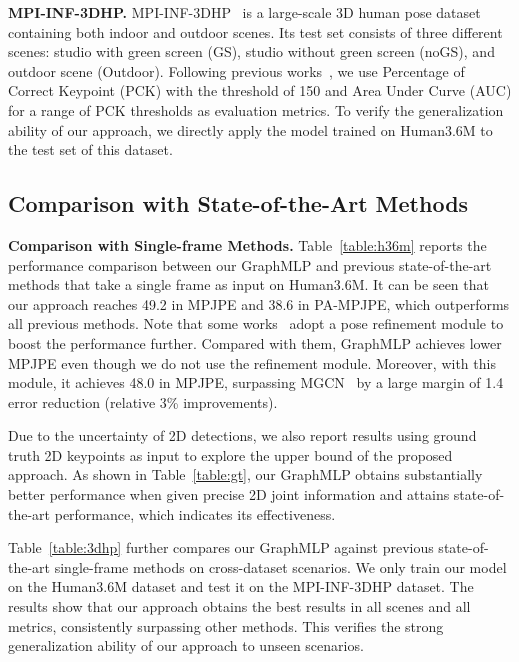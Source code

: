 \documentclass[lettersize,journal]{IEEEtran}
\begin{document}
\noindent \textbf{MPI-INF-3DHP.}
MPI-INF-3DHP~\cite{mehta2017monocular} is a large-scale 3D human pose dataset containing both indoor and outdoor scenes. 
Its test set consists of three different scenes: studio with green screen (GS), studio without green screen (noGS), and outdoor scene (Outdoor).
Following previous works~\cite{ci2019optimizing,zeng2021learning,zou2021modulated}, we use Percentage of Correct Keypoint (PCK) with the threshold of 150  and Area Under Curve (AUC) for a range of PCK thresholds as evaluation metrics. 
To verify the generalization ability of our approach, we directly apply the model trained on Human3.6M to the test set of this dataset. 

\subsection{Comparison with State-of-the-Art Methods}
\noindent \textbf{Comparison with Single-frame Methods.}
Table~\ref{table:h36m} reports the performance comparison between our GraphMLP and previous state-of-the-art methods that take a single frame as input on Human3.6M. 
It can be seen that our approach reaches 49.2  in MPJPE and 38.6  in PA-MPJPE, which outperforms all previous methods. 
Note that some works~\cite{stgcn,zou2021modulated} adopt a pose refinement module to boost the performance further. 
Compared with them, GraphMLP achieves lower MPJPE even though we do not use the refinement module. 
Moreover, with this module, it achieves 48.0  in MPJPE, surpassing MGCN~\cite{zou2021modulated} by a large margin of 1.4  error reduction (relative 3\% improvements). 

Due to the uncertainty of 2D detections, we also report results using ground truth 2D keypoints as input to explore the upper bound of the proposed approach. 
As shown in Table~\ref{table:gt}, our GraphMLP obtains substantially better performance when given precise 2D joint information and attains state-of-the-art performance, which indicates its effectiveness. 

Table~\ref{table:3dhp} further compares our GraphMLP against previous state-of-the-art single-frame methods on cross-dataset scenarios. 
We only train our model on the Human3.6M dataset and test it on the MPI-INF-3DHP dataset. 
The results show that our approach obtains the best results in all scenes and all metrics, consistently surpassing other methods. 
This verifies the strong generalization ability of our approach to unseen scenarios. 
\end{document}
